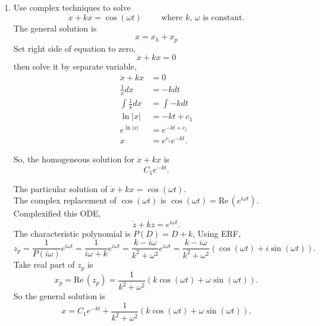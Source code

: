 \begin{enumerate}[label=\textbf{Part.\arabic*}]
\item \label{Part.1} Use complex techniques to solve
  \begin{equation*}
    \dot{x} + kx = \cos (\omega t) \qquad \text{ where } k,\, \omega \text{ is constant}. 
  \end{equation*}
  The general solution is
  \begin{equation*}
    x = x_ h + x_ p 
  \end{equation*}
  Set right side of equation to zero,
  \begin{equation*}
      \dot{x} + kx = 0
  \end{equation*}
  then solve it by separate variable,
  \begin{align*}
    \dot{x} + kx &= 0 \\
    \frac{1}{x} dx  &= -k dt \\
    \int \frac{1}{x} dx  &= \int -k dt \\
    \ln |x|  &= -kt + c_1 \\
    e^{\ln |x|}  &= e^{-kt + c_1} \\
    x  &= e^{c_ 1} e^{-kt}. 
  \end{align*}

  So, the homogeneous solution for $\dot{x} + kx$ is
  \begin{equation*}
    C_1 e^{-kt}. 
  \end{equation*}

  The particular solution of $\dot{x} + kx = \cos (\omega t)$. \\
  
  The complex replacement of $\cos (\omega t)$ is $\cos (\omega t) = \mathrm{Re\, }(e^{i \omega t})$. \\
  Complexified this ODE, 
  \begin{equation*}
    \dot{z} + kz = e^{i \omega t}. 
  \end{equation*}
  The characteristic polynomial is $P(D) = D + k$, Using ERF, 
  \begin{equation*}
    z_ p = \frac{1}{P(i \omega)} e^{i \omega t} = \frac{1}{i \omega  + k} e^{i \omega t}
    = \frac{k - i \omega}{k^2 + \omega ^2} e^{i \omega t}
    = \frac{k - i \omega}{k^2 + \omega ^2} \left( \cos (\omega t) + i \sin (\omega t) \right). 
  \end{equation*}
  Take real part of $z_ p$ is
  \begin{equation*}
    x_p = \mathrm{Re\, }(z_ p) 
    = \frac{1}{k^2 + \omega ^2} \left( k \cos (\omega t) + \omega \sin (\omega t) \right). 
  \end{equation*}
  So the general solution is
  \begin{equation*}
    x = C_1 e^{-kt} +
    \frac{1}{k^2 + \omega ^2} \left( k \cos (\omega t) + \omega \sin (\omega t) \right). 
  \end{equation*}
  

\end{enumerate}
